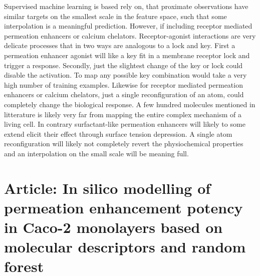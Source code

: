 Supervised machine learning is based rely on, that proximate observations have similar targets on the smallest scale in the feature space, such that some interpolation is a meaningful prediction. However, if including receptor mediated permeation enhancers or calcium chelators. Receptor-agonist interactions are very delicate processes that in two ways are analogous to a lock and key. First a permeation enhancer agonist will like a key fit in a membrane receptor lock and trigger a response. Secondly, just the slightest change of the key or lock could disable the activation. To map any possible key combination would take a very high number of training examples. Likewise for receptor mediated permeation enhancers or calcium chelators, just a single reconfiguration of an atom, could completely change the biological response. A few hundred molecules mentioned in litterature is likely very far from mapping the entire complex mechanism of a living cell. In contrary surfactant-like permeation enhancers will likely to some extend elicit their effect through surface tension depression. A single atom reconfiguration will likely not completely revert the physiochemical properties and an interpolation on the small scale will be meaning full.

\section{Article: In silico modelling of permeation enhancement potency in Caco-2
monolayers based on molecular descriptors and random forest}
\label{article:predAbs}

\newpage



